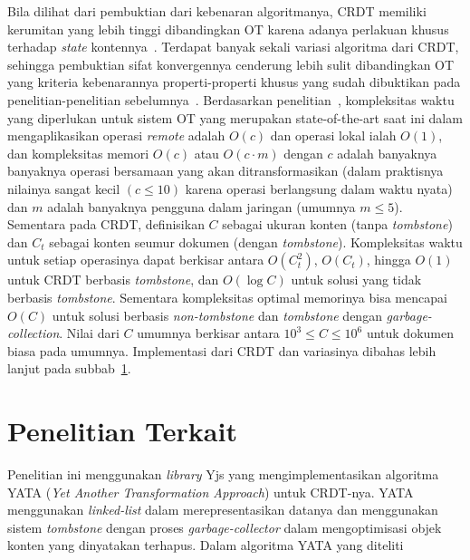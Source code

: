 Bila dilihat dari pembuktian dari kebenaran algoritmanya, CRDT memiliki kerumitan yang lebih tinggi dibandingkan OT karena adanya perlakuan khusus terhadap \textit{state} kontennya~\citep{Sun2019Second}. Terdapat banyak sekali variasi algoritma dari CRDT, sehingga pembuktian sifat konvergennya cenderung lebih sulit dibandingkan OT yang kriteria kebenarannya properti-properti khusus yang sudah dibuktikan pada penelitian-penelitian sebelumnya~\citep{OTOverview1, Sun2004, oster2005real}. Berdasarkan penelitian~\cite{Sun2019Second}, kompleksitas waktu yang diperlukan untuk sistem OT yang merupakan {state-of-the-art} saat ini dalam mengaplikasikan operasi \textit{remote} adalah $O(c)$ dan operasi lokal ialah $O(1)$, dan kompleksitas memori $O(c)$ atau $O(c \cdot m)$ dengan $c$ adalah banyaknya banyaknya operasi bersamaan yang akan ditransformasikan (dalam praktisnya nilainya sangat kecil $(c \leq 10)$ karena operasi berlangsung dalam waktu nyata) dan $m$ adalah banyaknya pengguna dalam jaringan (umumnya $m \leq 5$). Sementara pada CRDT, definisikan $C$ sebagai ukuran konten (tanpa \textit{tombstone}) dan $C_t$ sebagai konten seumur dokumen (dengan \textit{tombstone}). Kompleksitas waktu untuk setiap operasinya dapat berkisar antara $O(C_{t}^{2})$, $O(C_{t})$, hingga $O(1)$ untuk CRDT berbasis \textit{tombstone}, dan $O(\log C)$ untuk solusi yang tidak berbasis \textit{tombstone}. Sementara kompleksitas optimal memorinya bisa mencapai $O(C)$ untuk solusi berbasis \textit{non-tombstone} dan \textit{tombstone} dengan \textit{garbage-collection}. Nilai dari $C$ umumnya berkisar antara $10^3 \leq C \leq 10^6$ untuk dokumen biasa pada umumnya. Implementasi dari CRDT dan variasinya dibahas lebih lanjut pada subbab~\ref{sec:penelitian_terkait}.

\section{Penelitian Terkait}
\label{sec:penelitian_terkait}

Penelitian ini menggunakan \textit{library} Yjs yang mengimplementasikan algoritma YATA (\textit{Yet Another Transformation Approach}) untuk CRDT-nya. YATA menggunakan \textit{linked-list} dalam merepresentasikan datanya dan menggunakan sistem \textit{tombstone} dengan proses \textit{garbage-collector} dalam mengoptimisasi objek konten yang dinyatakan terhapus. Dalam algoritma YATA yang diteliti


